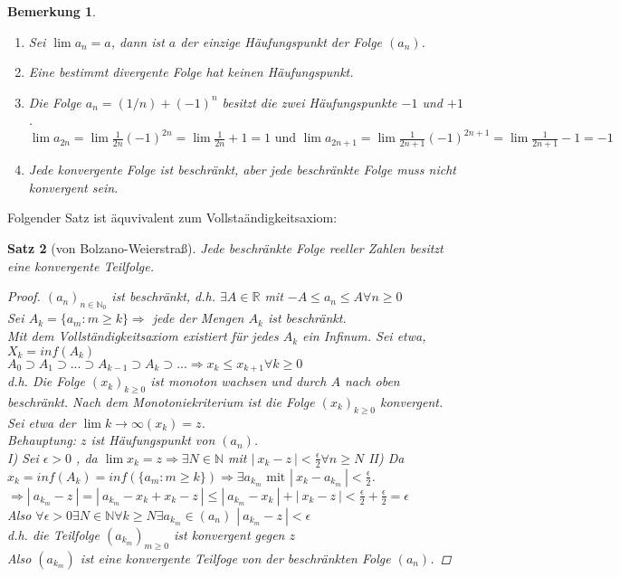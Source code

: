 \documentclass[a4paper,titlepage,oneside]{article}
\def\N{\ensuremath{\mathbb{N}} }
\def\R{\ensuremath{\mathbb{R}} }
\newcommand{\abs}[1]{\ensuremath{\left|\:#1\:\right|}}
\def\toinf{\ensuremath{\rightarrow \infty}}
\theoremstyle{thmstyle}
\newtheorem{satz}{Satz}[subsection]
\newtheorem{bem}[satz]{Bemerkung}
\begin{document}
\begin{bem}
\begin{enumerate}
\item Sei $\lim{a_n} = a$, dann ist $a$ der einzige Häufungspunkt der Folge $(a_n)$.
\item Eine bestimmt divergente Folge hat keinen Häufungspunkt.
\item Die Folge $a_n = (1/n)+ (-1)^n$ besitzt die zwei Häufungspunkte $-1$ und $+1$. $\lim{a_{2n}} = \lim{\frac{1}{2n} (-1)^{2n}} = \lim{\frac{1}{2n}} + 1 = 1 \text{ und } \lim{a_{2n+1}} = \lim{\frac{1}{2n+1} (-1)^{2n+1}} = \lim{\frac{1}{2n+1}} - 1 = - 1$
\item Jede konvergente Folge ist beschränkt, aber jede beschränkte Folge muss nicht konvergent sein.
\end{enumerate}
\end{bem}

Folgender Satz ist äquvivalent zum Vollstaändigkeitsaxiom:
\begin{satz}[von Bolzano-Weierstraß]
Jede beschränkte Folge reeller Zahlen besitzt eine konvergente Teilfolge.
\begin{proof}
\((a_n)_{n \in \N_0} \) ist beschränkt, d.h. $\exists A \in \R$ mit $-A \le a_n \le A \forall n \ge 0$\\
Sei $A_k = \{ a_m : m \ge k\} \Rightarrow$ jede der Mengen $A_k$ ist beschränkt.\\
Mit dem Vollständigkeitsaxiom existiert für jedes $A_k$ ein Infinum. Sei etwa, $X_k = inf(A_k)$\\
$A_0 \supset A_1 \supset ... \supset A_{k-1} \supset A_k \supset ... \Rightarrow x_k \le x_{k+1} \forall k \ge 0$\\
d.h. Die Folge $(x_k)_{k \ge 0}$ ist monoton wachsen und durch $A$ nach oben beschränkt. Nach dem Monotoniekriterium ist die Folge $(x_k)_{k \ge 0}$ konvergent.
Sei etwa der $\lim\limits{k \toinf}(x_k) = z$. \\
Behauptung: $z$ ist Häufungspunkt von $(a_n)$.\\
I) Sei $\epsilon > 0$ , da $\lim{x_k} = z \Rightarrow \exists N \in \N$ mit $\abs{x_k - z} < \frac{\epsilon}{2} \forall n \ge N$
II) Da $x_k = inf(A_k) = inf(\{a_m : m \ge k\}) \Rightarrow \exists a_{k_m} \text{ mit } \abs{x_k - a_{k_m}} < \frac{\epsilon}{2}$.
$\Rightarrow \abs{a_{k_m} - z} = \abs{a_{k_m} - x_k + x_k - z} \le  \abs{a_{k_m} - x_k} + \abs{x_k  -z} < \frac{\epsilon}{2} + \frac{\epsilon}{2} = \epsilon$\\
Also $\forall \epsilon > 0 \exists N \in \N \forall k \ge N\exists a_{k_m} \in (a_n)$
$\abs{a_{k_m} - z} < \epsilon$\\
d.h. die Teilfolge $(a_{k_m})_{m\ge 0}$ ist konvergent gegen $z$\\
Also $(a_{k_m})$ ist eine konvergente Teilfoge von der beschränkten Folge $(a_n)$.
\end{proof}
\end{satz}
\end{document}
